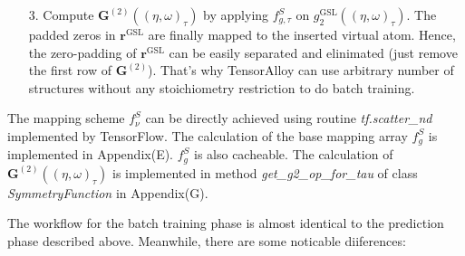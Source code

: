 \documentclass[final,1p,times]{elsarticle}
\begin{document}
\begin{itemize}
\begin{itemize}
    \end{itemize}
    
    \item[3.]
    Compute $\mathbf{G}^{(2)}((\eta, \omega)_{\tau})$ by applying 
    $f_{g,\tau}^{S}$ on $g^{\mathrm{GSL}}_{2}((\eta, \omega)_{\tau})$. The 
    padded zeros in $\mathbf{r}^{\mathrm{GSL}}$ are finally mapped to the 
    inserted virtual atom. Hence, the zero-padding of 
    $\mathbf{r}^{\mathrm{GSL}}$ can be easily separated and elinimated (just 
    remove the first row of $\mathbf{G}^{(2)}$). That's why TensorAlloy can use
    arbitrary number of structures without any stoichiometry restriction to do 
    batch training.

\end{itemize}

The mapping scheme $f_{\nu}^{S}$ can be directly achieved using routine 
\textit{tf.scatter\_nd} implemented by TensorFlow. The calculation of the base 
mapping array $f_{g}^{S}$ is implemented in Appendix(E). $f_{g}^{S}$ is also 
cacheable. The calculation of $\mathbf{G}^{(2)}((\eta, \omega)_{\tau})$ is 
implemented in method \textit{get\_g2\_op\_for\_tau} of class 
\textit{SymmetryFunction} in Appendix(G).

The workflow for the batch training phase is almost identical to the prediction 
phase described above. Meanwhile, there are some noticable diiferences:
\end{document}
